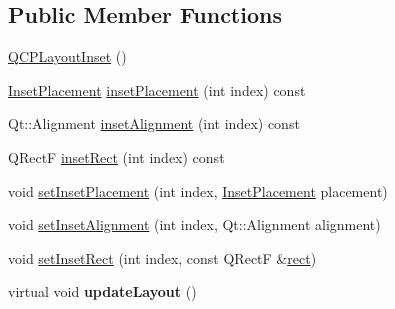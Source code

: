 \subsection*{\-Public \-Member \-Functions}
\begin{DoxyCompactItemize}
\item 
\hyperlink{classQCPLayoutInset_a3ad984f3221735374cc5dee14356a7dd}{\-Q\-C\-P\-Layout\-Inset} ()
\item 
\hyperlink{classQCPLayoutInset_a8b9e17d9a2768293d2a7d72f5e298192}{\-Inset\-Placement} \hyperlink{classQCPLayoutInset_a8472ff2508807513e4cb0ce0c1d652b3}{inset\-Placement} (int index) const 
\item 
\-Qt\-::\-Alignment \hyperlink{classQCPLayoutInset_a78c0c494bb5728237cebb63ae8ef5c58}{inset\-Alignment} (int index) const 
\item 
\-Q\-Rect\-F \hyperlink{classQCPLayoutInset_a5ec7037b3b8d20fbf9560e01779b1442}{inset\-Rect} (int index) const 
\item 
void \hyperlink{classQCPLayoutInset_a63298830744d5d8c5345511c00fd2144}{set\-Inset\-Placement} (int index, \hyperlink{classQCPLayoutInset_a8b9e17d9a2768293d2a7d72f5e298192}{\-Inset\-Placement} placement)
\item 
void \hyperlink{classQCPLayoutInset_a62882a4f9ad58bb0f53da12fde022abe}{set\-Inset\-Alignment} (int index, \-Qt\-::\-Alignment alignment)
\item 
void \hyperlink{classQCPLayoutInset_aa487c8378a6f9533567a2e6430099dc3}{set\-Inset\-Rect} (int index, const \-Q\-Rect\-F \&\hyperlink{classQCPLayoutElement_affdfea003469aac3d0fac5f4e06171bc}{rect})
\item 
\hypertarget{classQCPLayoutInset_a7b33fdd51b18e6db7cea9bfb2d263b4a}{virtual void {\bfseries update\-Layout} ()}\label{classQCPLayoutInset_a7b33fdd51b18e6db7cea9bfb2d263b4a}


\end{DoxyCompactItemize}
